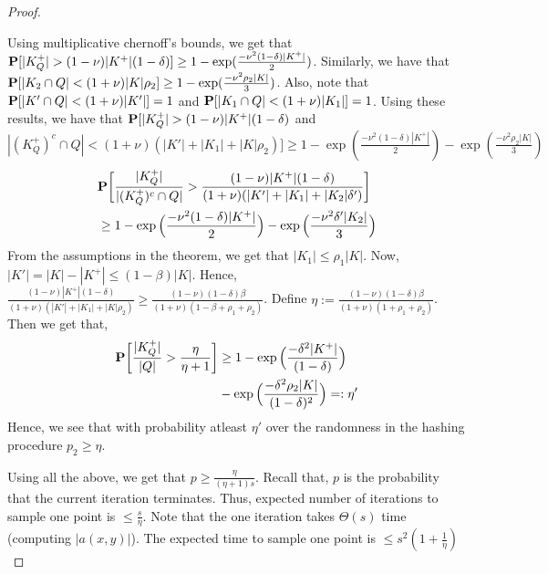 \begin{proof}
\begin{enumerate}[label=\textbf{T.\arabic*}]
Using multiplicative chernoff's bounds, we get that $\mathbf P[|K_Q^+| > (1-\nu)|K^+|(1-\delta) ] \ge 1 - \exp(\frac{-\nu^2 (1-\delta) |K^+|}{2})$. Similarly, we have that $\mathbf P[|K_2 \cap Q| < (1+\nu)|K| \rho_2] \ge 1 - \exp(\frac{-\nu^2 \rho_2 |K|}{3})$. Also, note that $\mathbf P[|K' \cap Q| < (1+\nu)|K'|] = 1$ and $\mathbf P[|K_1 \cap Q| < (1+\nu)|K_1|] = 1$. Using these results, we have that $\mathbf P[|K_Q^+| > (1-\nu)|K^+|(1-\delta)$ and $|(K^+_Q)^c \cap Q| < (1+\nu)(|K'|+|K_1|+|K|\rho_2)] \ge 1 - \exp(\frac{-\nu^2 (1-\delta) |K^+|}{2}) - \exp(\frac{-\nu^2 \rho_2 |K|}{3})$
\begin{align*}
  &\mathbf P\bigg[\frac{|K^+_Q|}{|(K^+_Q)^c \cap Q|} > \frac{(1-\nu)|K^+|(1-\delta)}{(1+\nu)(|K'|+|K_1|+|K_2|\delta')} \bigg] \\
  &\ge 1 - \exp\Big(\frac{-\nu^2 (1-\delta) |K^+|}{2}\Big) - \exp\Big(\frac{-\nu^2 \delta' |K_2|}{3}\Big)
\end{align*}
From the assumptions in the theorem, we get that $|K_1| \le \rho_1|K|$. Now, $|K'| = |K| - |K^+| \le (1-\beta)|K|$. Hence, $\frac{(1-\nu)|K^+|(1-\delta)}{(1+\nu)(|K'|+|K_1|+|K|\rho_2)} \ge \frac{(1-\nu)(1-\delta)\beta}{(1+\nu)(1-\beta + \rho_1 + \rho_2)}$. Define $\eta := \frac{(1-\nu)(1-\delta)\beta}{(1+\nu)(1 + \rho_1 + \rho_2)}$. Then we get that,
\begin{align*}
  \mathbf P\bigg[\frac{|K^+_Q|}{|Q|} > \frac{\eta}{\eta+1}\bigg] &\ge 1- \exp\Big(\frac{- \delta^2 |K^+|}{(1-\delta)}\Big) \\
  &- \exp\Big(\frac{-\delta^2\rho_2 |K|}{(1-\delta)^2}\Big) =: \eta'
\end{align*}
Hence, we see that with probability atleast $\eta'$ over the randomness in the hashing procedure $p_2 \ge \eta$.   
\end{enumerate}
Using all the above, we get that $p \ge \frac{\eta}{(\eta+1)s}$. Recall that, $p$ is the probability that the current iteration terminates. Thus, expected number of iterations to sample one point is $\le \frac{s}{\eta}$. Note that the one iteration takes $\Theta(s)$ time (computing $|a(x, y)|$). The expected time to sample one point is  $\le s^2(1 + \frac{1}{\eta})$ 
\end{proof}

